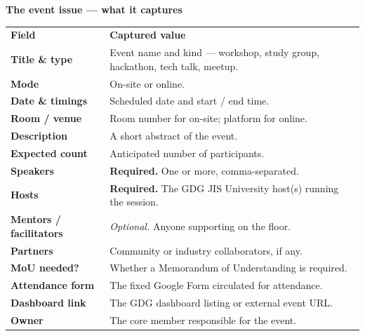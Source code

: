 \documentclass[11pt,a4paper]{article}
\begin{document}
{\bfseries\color{Ink}The event issue — what it captures}
\par\vspace{10pt}
\renewcommand{\arraystretch}{1.15}\begin{tabularx}{\linewidth}{@{}>{\raggedright\arraybackslash}p{3.9cm} X@{}}\textbf{Field} & \textbf{Captured value} \\[3pt]\arrayrulecolor{Line}\hline\rule{0pt}{2.4ex}\textbf{Title \& type} & Event name and kind — workshop, study group, hackathon, tech talk, meetup. \\[4pt]\textbf{Mode} & On-site or online. \\[4pt]\textbf{Date \& timings} & Scheduled date and start / end time. \\[4pt]\textbf{Room / venue} & Room number for on-site; platform for online. \\[4pt]\textbf{Description} & A short abstract of the event. \\[4pt]\textbf{Expected count} & Anticipated number of participants. \\[4pt]\textbf{Speakers} & \textbf{Required.} One or more, comma-separated. \\[4pt]\textbf{Hosts} & \textbf{Required.} The GDG JIS University host(s) running the session. \\[4pt]\textbf{Mentors / facilitators} & \textit{Optional.} Anyone supporting on the floor. \\[4pt]\textbf{Partners} & Community or industry collaborators, if any. \\[4pt]\textbf{MoU needed?} & Whether a Memorandum of Understanding is required. \\[4pt]\textbf{Attendance form} & The fixed Google Form circulated for attendance. \\[4pt]\textbf{Dashboard link} & The GDG dashboard listing or external event URL. \\[4pt]\textbf{Owner} & The core member responsible for the event. \\[4pt]\end{tabularx}
\end{document}
